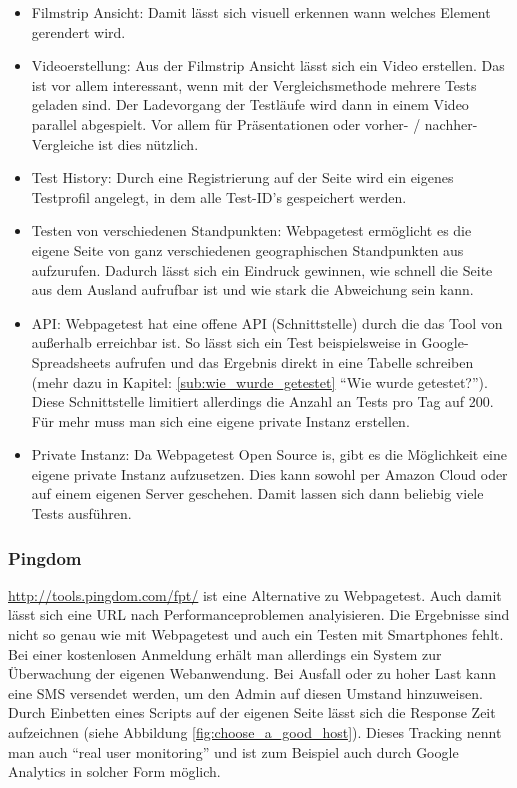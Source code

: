 \begin{itemize}
				\item Filmstrip Ansicht: Damit lässt sich visuell erkennen wann welches Element gerendert wird.

				\item Videoerstellung: Aus der Filmstrip Ansicht lässt sich ein Video erstellen. Das ist vor allem interessant, wenn mit der Vergleichsmethode mehrere Tests geladen sind. Der Ladevorgang der Testläufe wird dann in einem Video parallel abgespielt. Vor allem für Präsentationen oder vorher- / nachher-Vergleiche ist dies nützlich.

				\item Test History: Durch eine Registrierung auf der Seite wird ein eigenes Testprofil angelegt, in dem alle Test-ID's gespeichert werden.

				\item Testen von verschiedenen Standpunkten: Webpagetest ermöglicht es die eigene Seite von ganz verschiedenen geographischen Standpunkten aus aufzurufen. Dadurch lässt sich ein Eindruck gewinnen, wie schnell die Seite aus dem Ausland aufrufbar ist und wie stark die Abweichung sein kann.

				\item API: Webpagetest hat eine offene API (Schnittstelle) durch die das Tool von außerhalb erreichbar ist. So lässt sich ein Test beispielsweise in Google-Spreadsheets aufrufen und das Ergebnis direkt in eine Tabelle schreiben (mehr dazu in Kapitel: \ref{sub:wie_wurde_getestet} "`Wie wurde getestet?"'). Diese Schnittstelle limitiert allerdings die Anzahl an Tests pro Tag auf 200. Für mehr muss man sich eine eigene private Instanz erstellen. 

				\item Private Instanz: Da Webpagetest Open Source is, gibt es die Möglichkeit eine eigene private Instanz aufzusetzen. Dies kann sowohl per Amazon Cloud oder auf einem eigenen Server geschehen. Damit lassen sich dann beliebig viele Tests ausführen.

			\end{itemize}


		\subsubsection{Pingdom} %
		\label{ssub:pingdom}
			\url{http://tools.pingdom.com/fpt/} ist eine Alternative zu Webpagetest. Auch damit lässt sich eine URL nach Performanceproblemen analyisieren. Die Ergebnisse sind nicht so genau wie mit Webpagetest und auch ein Testen mit Smartphones fehlt. Bei einer kostenlosen Anmeldung erhält man allerdings ein System zur Überwachung der eigenen Webanwendung. Bei Ausfall oder zu hoher Last kann eine SMS versendet werden, um den Admin auf diesen Umstand hinzuweisen. Durch Einbetten eines Scripts auf der eigenen Seite lässt sich die Response Zeit aufzeichnen (siehe Abbildung \ref{fig:choose_a_good_host}). Dieses Tracking nennt man auch "`real user monitoring"' und ist zum Beispiel auch durch Google Analytics in solcher Form möglich.
		
